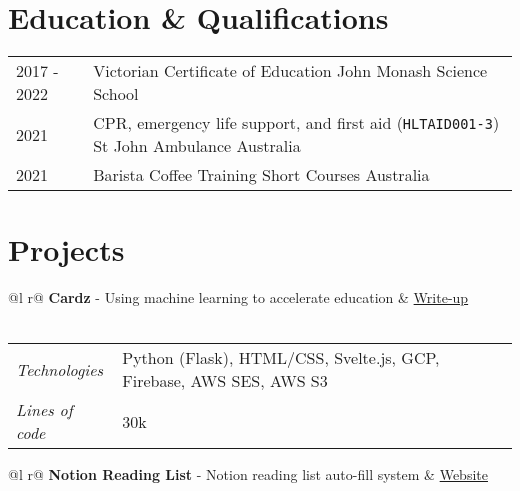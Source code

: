 \documentclass[a4paper,10pt]{article}
\begin{document}
\section{Education \& Qualifications}
\begin{tabularx}{\linewidth}{@{}l X@{}}	

2017 - 2022 & Victorian Certificate of Education \hfill John Monash Science School \\
2021 & CPR, emergency life support, and first aid (\texttt{HLTAID001-3}) \hfill St John Ambulance Australia \\
2021 & Barista Coffee Training \hfill Short Courses Australia \\

\end{tabularx}

\section{Projects}

\begin{tabularx}{\linewidth}{ @{}l r@{} }
\textbf{Cardz} - Using machine learning to accelerate education & \hfill \href{https://srg.id.au/posts/building-cardz}{Write-up} \\[3.75pt]
  \\

\end{tabularx}

\begin{tabularx}{\linewidth}{l X}
    \textit{Technologies} & \hfill Python (Flask), HTML/CSS, Svelte.js, GCP, Firebase, AWS SES, AWS S3 \\
    \textit{Lines of code} & \hfill 30k \\
\end{tabularx}

\begin{tabularx}{\linewidth}{ @{}l r@{} }
\textbf{Notion Reading List} - Notion reading list auto-fill system & \hfill \href{https://srg.id.au/notion-reading-list}{Website} \\[3.75pt]
  \\
\end{tabularx}
\end{document}
